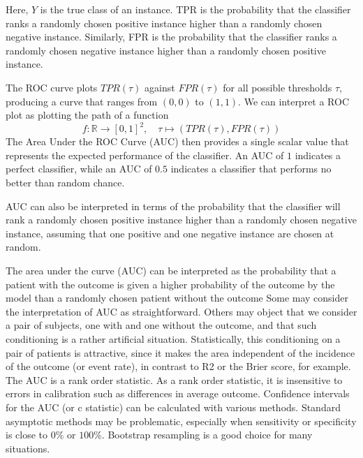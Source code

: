 Here, $Y$ is the true class of an instance. 
TPR is the probability that the classifier ranks a randomly chosen positive instance higher than a randomly chosen negative instance. 
Similarly, FPR is the probability that the classifier ranks a randomly chosen negative instance higher than a randomly chosen positive instance.
    
    	
The ROC curve plots $TPR(\tau)$ against $FPR(\tau)$ for all possible thresholds $\tau$, producing a curve that ranges from $(0,0)$ to $(1,1)$.
We can interpret a ROC plot as plotting the path of a function
\[
	f: \mathbb{R} \to [0,1]^2, \quad  \tau \mapsto (TPR(\tau), FPR(\tau))
\]
The Area Under the ROC Curve (AUC) then provides a single scalar value that represents the expected performance of the classifier.
An AUC of $1$ indicates a perfect classifier, while an AUC of $0.5$ indicates a classifier that performs no better than random chance.

AUC can also be interpreted in terms of the probability that the classifier will rank a randomly chosen positive instance higher than a randomly chosen negative instance,
assuming that one positive and one negative instance are chosen at random.

The area under the curve (AUC) can be interpreted as the probability that a patient with the outcome is given a higher probability of the outcome by the model
than a randomly chosen patient without the outcome
Some may consider the interpretation of AUC as straightforward. Others may object that we consider a pair of subjects, one with and one without the outcome, 
and that such conditioning is a rather artificial situation. 
Statistically, this conditioning on a pair of patients is attractive, since it makes the area independent of the incidence of the outcome (or event rate), 
in contrast to R2 or the Brier score, for example.
The AUC is a rank order statistic.
As a rank order statistic, it is insensitive to errors in calibration such as differences in average outcome.
Confidence intervals for the AUC (or c statistic) can be calculated with various methods. 
Standard asymptotic methods may be problematic, especially when sensitivity or specificity is close to $0\%$ or $100\%$. 
Bootstrap resampling is a good choice for many situations.

	
	
